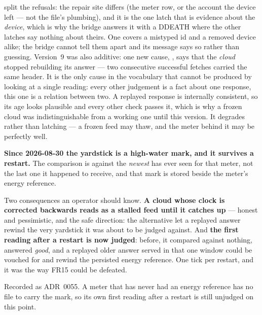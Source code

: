 split the refusals: the repair site differs (the meter row, or the account the device left ---
not the file's plumbing), and it is the one latch that is evidence about the \emph{device},
which is why the bridge answers it with a DDEATH where the other latches say nothing about
theirs. One  covers a mistyped id and a removed device alike; the bridge cannot tell
them apart and its message says so rather than guessing. Version~9
was also additive: one new cause, , says that the \emph{cloud} stopped
rebuilding its answer --- two consecutive successful fetches carried the same  header.
It is the only cause in the vocabulary that cannot be produced by looking at a single reading:
every other judgement is a fact about one response, this one is a relation between two. A replayed
response is internally consistent, so its age looks plausible and every other check passes it,
which is why a frozen cloud was indistinguishable from a working one until this version. It
degrades rather than latching --- a frozen feed may thaw, and the meter behind it may be perfectly
well.

\begin{note}
\textbf{Since 2026-08-30 the yardstick is a high-water mark, and it survives a restart.} The
comparison is against the \emph{newest}  \prog has ever seen for that meter, not the last
one it happened to receive, and that mark is stored beside the meter's energy reference.

Two consequences an operator should know. \textbf{A cloud whose clock is corrected backwards reads
as a stalled feed until it catches up} --- honest and pessimistic, and the safe direction: the
alternative let a replayed answer rewind the very yardstick it was about to be judged against. And
\textbf{the first reading after a restart is now judged}: before, it compared against nothing,
answered \emph{good}, and a replayed older answer served in that one window could be vouched for and
rewind the persisted energy reference. One tick per restart, and it was the way FR15 could be
defeated.

Recorded as ADR~0055. A meter that has never had an energy reference has no file to carry the mark,
so its own first reading after a restart is still unjudged on this point.
\end{note}

